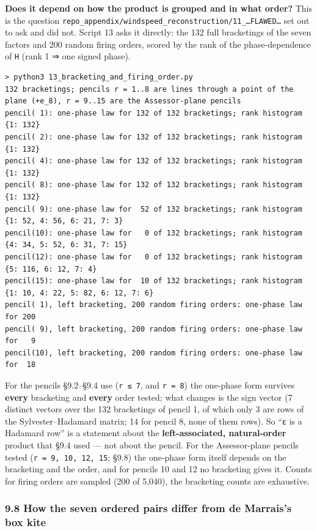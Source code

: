 \documentclass[
  10pt,
]{article}
\begin{document}
\textbf{Does it depend on how the product is grouped and in what order?}
This is the question
\texttt{repo\_appendix/windspeed\_reconstruction/11\_…FLAWED…} set out
to ask and did not. Script 13 asks it directly: the 132 full bracketings
of the seven factors and 200 random firing orders, scored by the rank of
the phase-dependence of \texttt{H} (rank 1 ⇒ one signed phase).

\begin{verbatim}
> python3 13_bracketing_and_firing_order.py
132 bracketings; pencils r = 1..8 are lines through a point of the plane (+e_8), r = 9..15 are the Assessor-plane pencils
pencil( 1): one-phase law for 132 of 132 bracketings; rank histogram {1: 132}
pencil( 2): one-phase law for 132 of 132 bracketings; rank histogram {1: 132}
pencil( 4): one-phase law for 132 of 132 bracketings; rank histogram {1: 132}
pencil( 8): one-phase law for 132 of 132 bracketings; rank histogram {1: 132}
pencil( 9): one-phase law for  52 of 132 bracketings; rank histogram {1: 52, 4: 56, 6: 21, 7: 3}
pencil(10): one-phase law for   0 of 132 bracketings; rank histogram {4: 34, 5: 52, 6: 31, 7: 15}
pencil(12): one-phase law for   0 of 132 bracketings; rank histogram {5: 116, 6: 12, 7: 4}
pencil(15): one-phase law for  10 of 132 bracketings; rank histogram {1: 10, 4: 22, 5: 82, 6: 12, 7: 6}
pencil( 1), left bracketing, 200 random firing orders: one-phase law for 200
pencil( 9), left bracketing, 200 random firing orders: one-phase law for   9
pencil(10), left bracketing, 200 random firing orders: one-phase law for  18
\end{verbatim}

For the pencils §9.2--§9.4 use (\texttt{r\ ≤\ 7}, and \texttt{r\ =\ 8})
the one-phase form survives \textbf{every} bracketing and \textbf{every}
order tested; what changes is the sign vector (7 distinct vectors over
the 132 bracketings of pencil 1, of which only 3 are rows of the
Sylvester--Hadamard matrix; 14 for pencil 8, none of them rows). So
``\texttt{ε} is a Hadamard row'' is a statement about the
\textbf{left-associated, natural-order} product that §9.4 used --- not
about the pencil. For the Assessor-plane pencils tested
(\texttt{r\ =\ 9,\ 10,\ 12,\ 15}; §9.8) the one-phase form itself
depends on the bracketing and the order, and for pencils 10 and 12 no
bracketing gives it. Counts for firing orders are sampled (200 of
5,040), the bracketing counts are exhaustive.

\hypertarget{how-the-seven-ordered-pairs-differ-from-de-marraiss-box-kite}{%
\subsubsection{9.8 How the seven ordered pairs differ from de Marrais's
box
kite}\label{how-the-seven-ordered-pairs-differ-from-de-marraiss-box-kite}}
\end{document}
